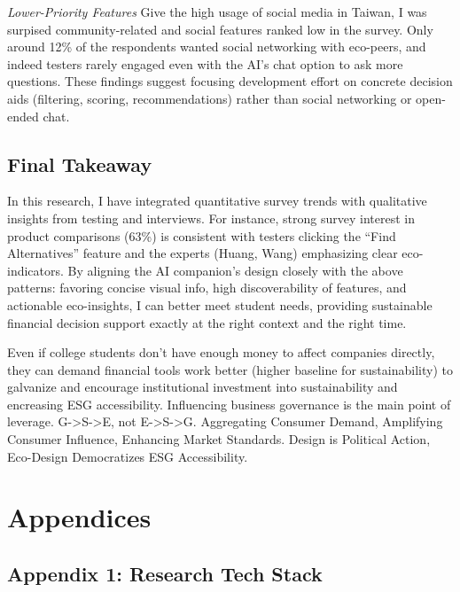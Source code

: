 \documentclass[
  12pt,
  letterpaper,
  DIV=11,
  numbers=noendperiod]{scrartcl}
\begin{document}
\emph{Lower-Priority Features} Give the high usage of social media in
Taiwan, I was surpised community-related and social features ranked low
in the survey. Only around 12\% of the respondents wanted social
networking with eco-peers, and indeed testers rarely engaged even with
the AI's chat option to ask more questions. These findings suggest
focusing development effort on concrete decision aids (filtering,
scoring, recommendations) rather than social networking or open-ended
chat.

\subsection{Final Takeaway}\label{final-takeaway}

In this research, I have integrated quantitative survey trends with
qualitative insights from testing and interviews. For instance, strong
survey interest in product comparisons (63\%) is consistent with testers
clicking the ``Find Alternatives'' feature and the experts (Huang, Wang)
emphasizing clear eco-indicators. By aligning the AI companion's design
closely with the above patterns: favoring concise visual info, high
discoverability of features, and actionable eco-insights, I can better
meet student needs, providing sustainable financial decision support
exactly at the right context and the right time.

Even if college students don't have enough money to affect companies
directly, they can demand financial tools work better (higher baseline
for sustainability) to galvanize and encourage institutional investment
into sustainability and encreasing ESG accessibility. Influencing
business governance is the main point of leverage.
G-\textgreater S-\textgreater E, not E-\textgreater S-\textgreater G.
Aggregating Consumer Demand, Amplifying Consumer Influence, Enhancing
Market Standards. Design is Political Action, Eco-Design Democratizes
ESG Accessibility.

\newpage

\section{Appendices}\label{appendices}

\subsection{Appendix 1: Research Tech
Stack}\label{appendix-1-research-tech-stack}
\end{document}
